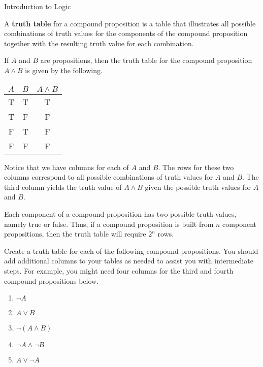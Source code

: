 \begin{section}{Introduction to Logic}
\begin{definition}
  A \textbf{truth table} for a compound proposition is a table that
  illustrates all possible combinations of truth values for the
  components of the compound proposition together with the resulting
  truth value for each combination.
\end{definition}

\begin{example}
  If $A$ and $B$ are propositions, then the truth table for the
  compound proposition $A\wedge B$ is given by the following.
\begin{center}
\begin{tabular}{@{}ccc@{}}
\toprule
$A$  &  $B$ & $A \wedge B$  \\
\midrule
T & T & T  \\ 
T & F & F  \\ 
F & T & F  \\ 
F & F & F  \\
\bottomrule
\end{tabular}
\end{center}
Notice that we have columns for each of $A$ and $B$.  The rows for
these two columns correspond to all possible combinations of truth
values for $A$ and $B$.  The third column yields the truth value of
$A\wedge B$ given the possible truth values for $A$ and $B$.
\end{example}

Each component of a compound proposition has two possible truth
values, namely true or false. Thus, if a compound proposition is built
from $n$ component propositions, then the truth table will require
$2^n$ rows.



\begin{problem}
  Create a truth table for each of the following compound
  propositions. You should add additional columns to your tables as
  needed to assist you with intermediate steps. For example, you might
  need four columns for the third and fourth compound propositions
  below.
\begin{enumerate}[label=\textrm{(\alph*)}]
\item $\neg A$
\item $A \vee B$
\item $\neg (A \wedge B)$
\item $\neg A \wedge \neg B$
  
\item $A \vee \neg A$
\end{enumerate}
\end{problem}


\end{section}
